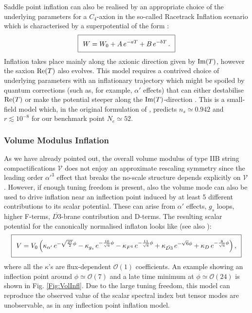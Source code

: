 Saddle point inflation can also be realised by an appropriate choice of the underlying parameters for a $C_4$-axion in the so-called Racetrack Inflation scenario which is characterised by a superpotential of the form \cite{Blanco-Pillado:2004aap,Blanco-Pillado:2006dgl}:
\begin{equation}
\setlength\fboxsep{0.25cm}
\setlength\fboxrule{0.4pt}
\boxed{
W = W_0 + A\,e^{-a T} + B\,e^{-b T}\,.
}
\end{equation}
Inflation takes place mainly along the axionic direction given by ${\rm Im}(T)$, however the saxion ${\rm Re}(T)$ also evolves. This model requires a contrived choice of underlying parameters with an inflationary trajectory which might be spoiled by quantum corrections (such as, for example, $\alpha'$ effects) that can either destabilise ${\rm Re}(T)$ or make the potential steeper along the ${\rm Im}(T)$-direction \cite{Greene:2005rn}. This is a small-field model which, in the original formulation of \cite{Blanco-Pillado:2004aap}, predicts $n_s\simeq 0.942$ and $r\lesssim 10^{-8}$ for our benchmark point $N_e\simeq 52$. 

\subsubsection*{Volume Modulus Inflation}

As we have already pointed out, the overall volume modulus of type IIB string compactifications $\mathcal{V}$ does not enjoy an approximate rescaling symmetry since the leading order $\alpha'^3$ effect that breaks the no-scale structure depends explicitly on $\mathcal{V}$. However, if enough tuning freedom is present, also the volume mode can also be used to drive inflation near an inflection point induced by at least 5 different contributions to its scalar potential. These can arise from $\alpha'$ effects, $g_s$ loops, higher F-terms, $\overline{D3}$-brane contribution and D-terms. The resulting scalar potential for the canonically normalised inflaton looks like \cite{Cicoli:2015wja} (see also \cite{Antoniadis:2020stf}):
\begin{equation}
\setlength\fboxsep{0.25cm}
\setlength\fboxrule{0.4pt}
\boxed{
V = V_0 \left(\kappa_{\alpha'}\,e^{-\sqrt{\frac{27}{2}}\phi}-\kappa_{g_s}\,e^{-\frac{10}{\sqrt{6}}\phi}-\kappa_{F^4}\,e^{-\frac{11}{\sqrt{6}}\phi}
+\kappa_{\bar{D3}}\,e^{-\sqrt{6}\phi}+\kappa_D\,e^{-\frac{8}{\sqrt{6}}\phi}\right),
}
\label{Vpot}
\end{equation}
where all the $\kappa$'s are flux-dependent $\mathcal{O}(1)$ coefficients. An example showing an inflection point around $\phi\simeq \mathcal{O}(7)$ and a late time minimum at $\phi\simeq \mathcal{O}(24)$ is shown in Fig. \ref{Fig:VolInfl}. Due to the large tuning freedom, this model can reproduce the observed value of the scalar spectral index but tensor modes are unobservable, as in any inflection point inflation model.

